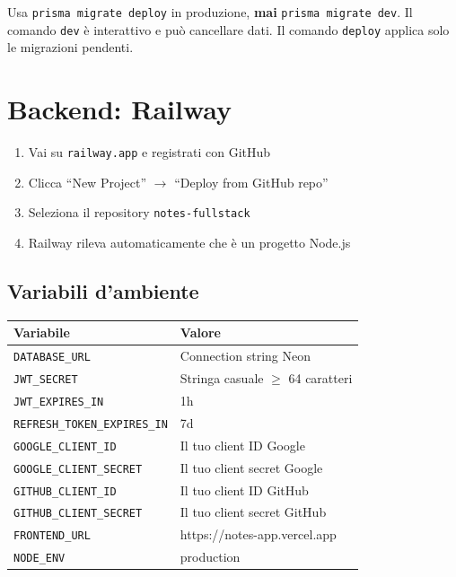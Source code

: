 \begin{warnbox}
Usa \texttt{prisma migrate deploy} in produzione, \textbf{mai} \texttt{prisma migrate dev}. Il comando \texttt{dev} è interattivo e può cancellare dati. Il comando \texttt{deploy} applica solo le migrazioni pendenti.
\end{warnbox}

\section{Backend: Railway}

\begin{praticabox}[title={Pratica --- Setup Railway}]
\begin{enumerate}
  \item Vai su \texttt{railway.app} e registrati con GitHub
  \item Clicca ``New Project'' $\rightarrow$ ``Deploy from GitHub repo''
  \item Seleziona il repository \texttt{notes-fullstack}
  \item Railway rileva automaticamente che è un progetto Node.js
\end{enumerate}
\end{praticabox}

\subsection{Variabili d'ambiente}

\begin{center}
\begin{small}
\begin{tabularx}{\textwidth}{l X}
\toprule
\textbf{Variabile} & \textbf{Valore} \\
\midrule
\texttt{DATABASE\_URL} & Connection string Neon \\
\texttt{JWT\_SECRET} & Stringa casuale $\geq$ 64 caratteri \\
\texttt{JWT\_EXPIRES\_IN} & 1h \\
\texttt{REFRESH\_TOKEN\_EXPIRES\_IN} & 7d \\
\texttt{GOOGLE\_CLIENT\_ID} & Il tuo client ID Google \\
\texttt{GOOGLE\_CLIENT\_SECRET} & Il tuo client secret Google \\
\texttt{GITHUB\_CLIENT\_ID} & Il tuo client ID GitHub \\
\texttt{GITHUB\_CLIENT\_SECRET} & Il tuo client secret GitHub \\
\texttt{FRONTEND\_URL} & https://notes-app.vercel.app \\
\texttt{NODE\_ENV} & production \\
\bottomrule
\end{tabularx}
\end{small}
\end{center}

